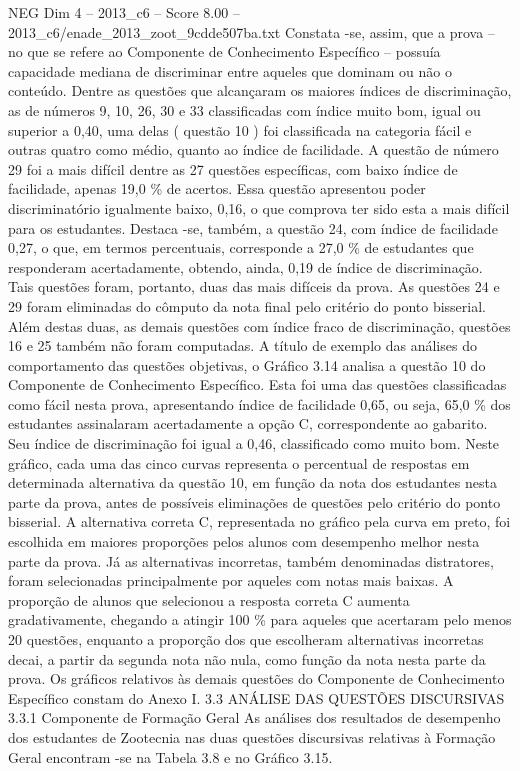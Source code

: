 \begin{textsample}{NEG Dim 4 – 2013\_c6 – Score 8.00 – 2013\_c6/enade\_2013\_zoot\_9cdde507ba.txt}
Constata -se, assim, que a prova – no que se refere ao Componente de Conhecimento Específico – possuía capacidade mediana de discriminar entre aqueles que dominam ou não o conteúdo.
Dentre as questões que alcançaram os maiores índices de discriminação, as de números 9, 10, 26, 30 e 33 classificadas com índice muito bom, igual ou superior a 0,40, uma delas ( questão 10 ) foi classificada na categoria fácil e outras quatro como médio, quanto ao índice de facilidade.
A questão de número 29 foi a mais difícil dentre as 27 questões específicas, com baixo índice de facilidade, apenas 19,0 \% de acertos.
Essa questão apresentou poder discriminatório igualmente baixo, 0,16, o que comprova ter sido esta a mais difícil para os estudantes.
Destaca -se, também, a questão 24, com índice de facilidade 0,27, o que, em termos percentuais, corresponde a 27,0 \% de estudantes que responderam acertadamente, obtendo, ainda, 0,19 de índice de discriminação.
Tais questões foram, portanto, duas das mais difíceis da prova.
As questões 24 e 29 foram eliminadas do cômputo da nota final pelo critério do ponto bisserial.
Além destas duas, as demais questões com índice fraco de discriminação, questões 16 e 25 também não foram computadas.
A título de exemplo das análises do comportamento das questões objetivas, o Gráfico 3.14 analisa a questão 10 do Componente de Conhecimento Específico.
Esta foi uma das questões classificadas como fácil nesta prova, apresentando índice de facilidade 0,65, ou seja, 65,0 \% dos estudantes assinalaram acertadamente a opção C, correspondente ao gabarito.
Seu índice de discriminação foi igual a 0,46, classificado como muito bom.
Neste gráfico, cada uma das cinco curvas representa o percentual de respostas em determinada alternativa da questão 10, em função da nota dos estudantes nesta parte da prova, antes de possíveis eliminações de questões pelo critério do ponto bisserial.
A alternativa correta C, representada no gráfico pela curva em preto, foi escolhida em maiores proporções pelos alunos com desempenho melhor nesta parte da prova.
Já as alternativas incorretas, também denominadas distratores, foram selecionadas principalmente por aqueles com notas mais baixas.
A proporção de alunos que selecionou a resposta correta C aumenta gradativamente, chegando a atingir 100 \% para aqueles que acertaram pelo menos 20 questões, enquanto a proporção dos que escolheram alternativas incorretas decai, a partir da segunda nota não nula, como função da nota nesta parte da prova.
Os gráficos relativos às demais questões do Componente de Conhecimento Específico constam do Anexo I. 3.3 ANÁLISE DAS QUESTÕES DISCURSIVAS 3.3.1 Componente de Formação Geral As análises dos resultados de desempenho dos estudantes de Zootecnia nas duas questões discursivas relativas à Formação Geral encontram -se na Tabela 3.8 e no Gráfico 3.15.

\end{textsample}
